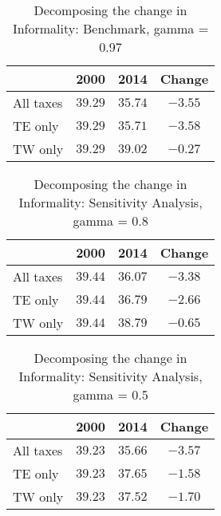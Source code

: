 \documentclass[12pt]{article}
\begin{document}
 
 \begin{table}[htb]
 \caption{Decomposing the change in Informality: Benchmark, gamma = 0.97}
 \begin{center}
 \begin{tabular}{lccc}
    & 2000 & 2014 & Change \\ \hline
  All taxes &  $39.29$ & $35.74$ & $-3.55$ \\ 
  TE only &  $39.29$ & $35.71$ & $-3.58$ \\ 
  TW only &  $39.29$ & $39.02$ & $-0.27$ \\ 
 \hline
 \end{tabular}
 \end{center}
 \end{table}
 
 \begin{table}[htb]
 \caption{Decomposing the change in Informality: Sensitivity Analysis, gamma = 0.8}
 \begin{center}
 \begin{tabular}{lccc}
    & 2000 & 2014 & Change \\ \hline
  All taxes &  $39.44$ & $36.07$ & $-3.38$ \\ 
  TE only &  $39.44$ & $36.79$ & $-2.66$ \\ 
  TW only &  $39.44$ & $38.79$ & $-0.65$ \\ 
 \hline
 \end{tabular}
 \end{center}
 \end{table}
 
 \begin{table}[htb]
 \caption{Decomposing the change in Informality: Sensitivity Analysis, gamma = 0.5}
 \begin{center}
 \begin{tabular}{lccc}
    & 2000 & 2014 & Change \\ \hline
  All taxes &  $39.23$ & $35.66$ & $-3.57$ \\ 
  TE only &  $39.23$ & $37.65$ & $-1.58$ \\ 
  TW only &  $39.23$ & $37.52$ & $-1.70$ \\ 
 \hline
 \end{tabular}
 \end{center}
 \end{table}

 
\end{document}
